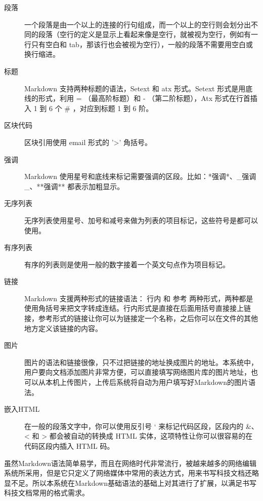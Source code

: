 \begin{description}
\item[段落] 一个段落是由一个以上的连接的行句组成，而一个以上的空行则会划分出不同的段落（空行的定义是显示上看起来像是空行，就被视为空行，例如有一行只有空白和 tab，那该行也会被视为空行），一般的段落不需要用空白或换行缩进。
\item[标题] Markdown 支持两种标题的语法，Setext 和 atx 形式。Setext 形式是用底线的形式，利用 = （最高阶标题）和 - （第二阶标题），Atx 形式在行首插入 1 到 6 个 \# ，对应到标题 1 到 6 阶。
\item[区块代码] 区块引用使用 email 形式的 '>' 角括号。
\item[强调] Markdown 使用星号和底线来标记需要强调的区段。比如：*强调*、\_强调\_、**强调** 都表示加粗显示。
\item[无序列表] 无序列表使用星号、加号和减号来做为列表的项目标记，这些符号是都可以使用。
\item[有序列表] 有序的列表则是使用一般的数字接着一个英文句点作为项目标记。
\item[链接] Markdown 支援两种形式的链接语法： 行内 和 参考 两种形式，两种都是使用角括号来把文字转成连结。行内形式是直接在后面用括号直接接上链接，参考形式的链接让你可以为链接定一个名称，之后你可以在文件的其他地方定义该链接的内容。
\item[图片] 图片的语法和链接很像，只不过把链接的地址换成图片的地址。本系统中，用户要向文档添加图片非常方便，可以直接填写网络图片库的图片地址，也可以从本机上传图片，上传后系统将自动为用户填写好Markdown的图片语法。
\item[嵌入HTML] 在一般的段落文字中，你可以使用反引号 ` 来标记代码区段，区段内的 \&、< 和 > 都会被自动的转换成 HTML 实体，这项特性让你可以很容易的在代码区段内插入 HTML 码。
\end{description}
虽然Markdown语法简单易学，而且在网络时代非常流行，被越来越多的网络编辑系统所采用，但是它只定义了网络媒体中常用的表达方式，用来书写科技文档还略显不足。所以本系统在Markdown基础语法的基础上对其进行了扩展，以满足书写科技文档常用的格式需求。

\subsection{}
\label{sec:smarkdownextr}

